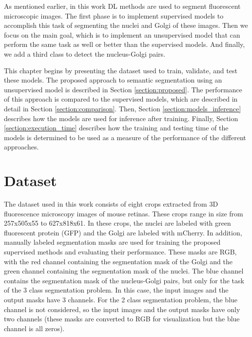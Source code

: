 \label{chapter:methodology}

As mentioned earlier, in this work \ac{DL} methods are used to segment fluorescent microscopic images. The first phase is to implement supervised models to accomplish this task of segmenting the nuclei and Golgi of these images. Then we focus on the main goal, which is to implement an unsupervised model that can perform the same task as well or better than the supervised models. And finally, we add a third class to detect the nucleus-Golgi pairs.

This chapter begins by presenting the dataset used to train, validate, and test these models. The proposed approach to semantic segmentation using an unsupervised model is described in Section \ref{section:proposed}. The performance of this approach is compared to the supervised models, which are described in detail in Section \ref{section:comparison}. Then, Section \ref{section:models_inference} describes how the models are used for inference after training. Finally, Section \ref{section:execution_time} describes how the training and testing time of the models is determined to be used as a measure of the performance of the different approaches.

\section{Dataset}
\label{section:dataset}

The dataset used in this work consists of eight crops extracted from \ac{3D} fluorescence microscopy images of mouse retinas. These crops range in size from 257x505x55 to 627x818x61. In these crops, the nuclei are labeled with green fluorescent protein (GFP) and the Golgi are labeled with mCherry. In addition, manually labeled segmentation masks are used for training the proposed supervised methods and evaluating their performance. These masks are RGB, with the red channel containing the segmentation mask of the Golgi and the green channel containing the segmentation mask of the nuclei. The blue channel contains the segmentation mask of the nucleus-Golgi pairs, but only for the task of the 3 class segmentation problem. In this case, the input images and the output masks have 3 channels. For the 2 class segmentation problem, the blue channel is not considered, so the input images and the output masks have only two channels (these masks are converted to RGB for visualization but the blue channel is all zeros).

